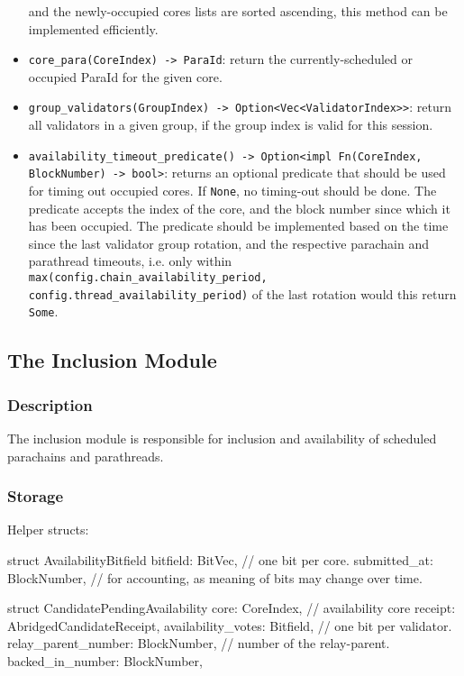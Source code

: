 \begin{itemize}
    and the newly-occupied cores lists are sorted ascending, this method can be
    implemented efficiently.
    \item \verb|core_para(CoreIndex) -> ParaId|: return the currently-scheduled or
    occupied ParaId for the given core.
    \item \verb|group_validators(GroupIndex) -> Option<Vec<ValidatorIndex>>|: return
    all validators in a given group, if the group index is valid for this
    session.
    \item \verb|availability_timeout_predicate() -> Option<impl Fn(CoreIndex,|
    \verb|BlockNumber) -> bool>|: returns an optional predicate that should be used for
    timing out occupied cores. If \verb|None|, no timing-out should be done. The
    predicate accepts the index of the core, and the block number since which it
    has been occupied. The predicate should be implemented based on the time
    since the last validator group rotation, and the respective parachain and
    parathread timeouts, i.e. only within \verb|max(config.chain_availability_period,|
    \newline
    \verb|config.thread_availability_period)| of the last rotation would this return
    \verb|Some|.
\end{itemize}

\subsection{The Inclusion Module}

\subsubsection{Description}

The inclusion module is responsible for inclusion and availability of scheduled
parachains and parathreads.

\subsubsection{Storage}

Helper structs:

\begin{verbnobox}[\small]
struct AvailabilityBitfield {
  bitfield: BitVec, // one bit per core.
  submitted_at: BlockNumber, // for accounting, as meaning of bits may change over time.
}

struct CandidatePendingAvailability {
  core: CoreIndex, // availability core
  receipt: AbridgedCandidateReceipt,
  availability_votes: Bitfield, // one bit per validator.
  relay_parent_number: BlockNumber, // number of the relay-parent.
  backed_in_number: BlockNumber,
}
\end{verbnobox}

